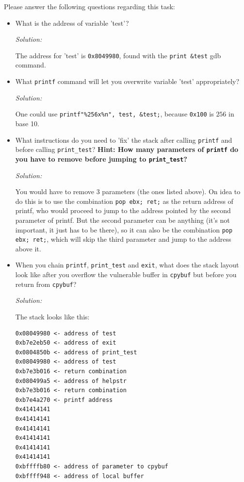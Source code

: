 \documentclass[a4paper,11pt]{article}
\newenvironment{solution}%
{\par{\noindent\small\textit{Solution:}}\vspace{-12pt}\begin{framed}}%
{\end{framed}\par}
\begin{document}
\noindent Please answer the following questions regarding this task:

\begin{itemize}
\item What is the address of variable 'test'?
\ifsolution\begin{solution}
The address for 'test' is \texttt{0x8049980}, found with the \texttt{print \&test} gdb command.
\end{solution}\fi
\item What \texttt{printf} command will let you overwrite variable 'test'
  appropriately?
\ifsolution\begin{solution}
One could use \texttt{printf{"\%256x\%n", test, \&test};}, because \texttt{0x100} is $256$ in base 10.
\end{solution}\fi
\item What instructions do you need to 'fix' the stack after calling
  \texttt{printf} and before calling \texttt{print\_test}? \textbf{Hint: How
    many parameters of \texttt{printf} do you have to remove before jumping to \texttt{print\_test}?}
\ifsolution\begin{solution}
You would have to remove 3 parameters (the ones listed above). On idea to do this is to use the combination
\texttt{pop ebx; ret;} as the return address of printf, who would proceed to jump to the address pointed
by the second parameter of printf. But the second parameter can be anything (it's not important, it just
has to be there), so it can also be the combination \texttt{pop ebx; ret;}, which will skip the third parameter
and jump to the address above it.
\end{solution}\fi
\item When you chain \texttt{printf}, \texttt{print\_test} and \texttt{exit}, what does the stack
  layout look like after you overflow the vulnerable buffer in \texttt{cpybuf}
  but before you return from \texttt{cpybuf}?
\ifsolution\begin{solution}
The stack looks like this:
\begin{lstlisting}
0x08049980 <- address of test
0xb7e2eb50 <- address of exit
0x0804850b <- address of print_test
0x08049980 <- address of test
0xb7e3b016 <- return combination
0x080499a5 <- address of helpstr
0xb7e3b016 <- return combination
0xb7e4a270 <- printf address
0x41414141
0x41414141
0x41414141
0x41414141
0x41414141
0x41414141
0xbffffb80 <- address of parameter to cpybuf
0xbffff948 <- address of local buffer
\end{lstlisting}


\end{solution}
\end{itemize}
\end{document}
